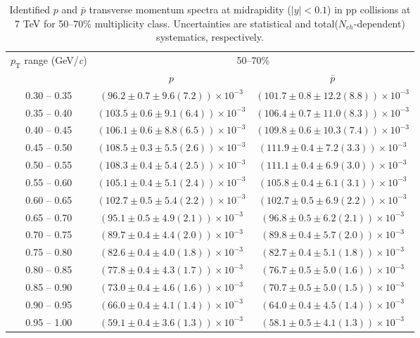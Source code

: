 \begin{table}
\caption{Identified $p$ and $\bar{p}$  transverse momentum spectra at midrapidity ($|y|<0.1$) in pp collisions at 7 TeV for 50--70\% multiplicity class. Uncertainties are statistical and total($N_{ch}$-dependent) systematics, respectively.}
\label{tab:ProtonPlus_ProtonMinus_50to70}
\begin{center}
\begin{tabular}{ c | c c }
\hline
\multirow{2}{*}{$p_{\mathrm{T}}$ range (GeV/\textit{c})} & \multicolumn{2}{c}{50--70\%} \\ & $p$& $\bar{p}$\\ 
\hline
0.30 -- 0.35 & $(96.2\pm0.7\pm9.6(7.2))\times10^{-3}$ & $(101.7\pm0.8\pm12.2(8.8))\times10^{-3}$ \\ 
0.35 -- 0.40 & $(103.5\pm0.6\pm9.1(6.4))\times10^{-3}$ & $(106.4\pm0.7\pm11.0(8.3))\times10^{-3}$ \\ 
0.40 -- 0.45 & $(106.1\pm0.6\pm8.8(6.5))\times10^{-3}$ & $(109.8\pm0.6\pm10.3(7.4))\times10^{-3}$ \\ 
0.45 -- 0.50 & $(108.5\pm0.3\pm5.5(2.6))\times10^{-3}$ & $(111.9\pm0.4\pm7.2(3.3))\times10^{-3}$ \\ 
0.50 -- 0.55 & $(108.3\pm0.4\pm5.4(2.5))\times10^{-3}$ & $(111.1\pm0.4\pm6.9(3.0))\times10^{-3}$ \\ 
0.55 -- 0.60 & $(105.1\pm0.4\pm5.1(2.4))\times10^{-3}$ & $(105.8\pm0.4\pm6.1(3.1))\times10^{-3}$ \\ 
0.60 -- 0.65 & $(102.7\pm0.5\pm5.4(2.2))\times10^{-3}$ & $(102.7\pm0.5\pm6.9(2.2))\times10^{-3}$ \\ 
0.65 -- 0.70 & $(95.1\pm0.5\pm4.9(2.1))\times10^{-3}$ & $(96.8\pm0.5\pm6.2(2.1))\times10^{-3}$ \\ 
0.70 -- 0.75 & $(89.7\pm0.4\pm4.4(2.0))\times10^{-3}$ & $(89.8\pm0.4\pm5.7(2.0))\times10^{-3}$ \\ 
0.75 -- 0.80 & $(82.6\pm0.4\pm4.0(1.8))\times10^{-3}$ & $(82.7\pm0.4\pm5.1(1.8))\times10^{-3}$ \\ 
0.80 -- 0.85 & $(77.8\pm0.4\pm4.3(1.7))\times10^{-3}$ & $(76.7\pm0.5\pm5.0(1.6))\times10^{-3}$ \\ 
0.85 -- 0.90 & $(73.0\pm0.4\pm4.6(1.6))\times10^{-3}$ & $(70.7\pm0.5\pm5.0(1.5))\times10^{-3}$ \\ 
0.90 -- 0.95 & $(66.0\pm0.4\pm4.1(1.4))\times10^{-3}$ & $(64.0\pm0.4\pm4.5(1.4))\times10^{-3}$ \\ 
0.95 -- 1.00 & $(59.1\pm0.4\pm3.6(1.3))\times10^{-3}$ & $(58.1\pm0.5\pm4.1(1.3))\times10^{-3}$ \\ 

\end{tabular}
\end{center}
\end{table}
